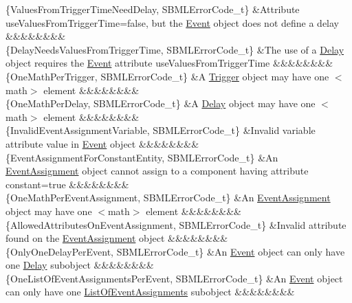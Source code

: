\begin{DoxyParagraph}{}
\begin{longtabu}
\{Values\+From\+Trigger\+Time\+Need\+Delay, S\+B\+M\+L\+Error\+Code\+\_\+t\} &Attribute \textquotesingle{}use\+Values\+From\+Trigger\+Time\textquotesingle{}=\textquotesingle{}false\textquotesingle{}, but the \hyperlink{class_event}{Event} object does not define a delay &&&&&&&&\\
\{Delay\+Needs\+Values\+From\+Trigger\+Time, S\+B\+M\+L\+Error\+Code\+\_\+t\} &The use of a \hyperlink{class_delay}{Delay} object requires the \hyperlink{class_event}{Event} attribute \textquotesingle{}use\+Values\+From\+Trigger\+Time\textquotesingle{} &&&&&&&&\\
\{One\+Math\+Per\+Trigger, S\+B\+M\+L\+Error\+Code\+\_\+t\} &A \hyperlink{class_trigger}{Trigger} object may have one {\ttfamily $<$math$>$} element &&&&&&&&\\
\{One\+Math\+Per\+Delay, S\+B\+M\+L\+Error\+Code\+\_\+t\} &A \hyperlink{class_delay}{Delay} object may have one {\ttfamily $<$math$>$} element &&&&&&&&\\
\{Invalid\+Event\+Assignment\+Variable, S\+B\+M\+L\+Error\+Code\+\_\+t\} &Invalid \textquotesingle{}variable\textquotesingle{} attribute value in \hyperlink{class_event}{Event} object &&&&&&&&\\
\{Event\+Assignment\+For\+Constant\+Entity, S\+B\+M\+L\+Error\+Code\+\_\+t\} &An \hyperlink{class_event_assignment}{Event\+Assignment} object cannot assign to a component having attribute \textquotesingle{}constant\textquotesingle{}=\textquotesingle{}true\textquotesingle{} &&&&&&&&\\
\{One\+Math\+Per\+Event\+Assignment, S\+B\+M\+L\+Error\+Code\+\_\+t\} &An \hyperlink{class_event_assignment}{Event\+Assignment} object may have one {\ttfamily $<$math$>$} element &&&&&&&&\\
\{Allowed\+Attributes\+On\+Event\+Assignment, S\+B\+M\+L\+Error\+Code\+\_\+t\} &Invalid attribute found on the \hyperlink{class_event_assignment}{Event\+Assignment} object &&&&&&&&\\
\{Only\+One\+Delay\+Per\+Event, S\+B\+M\+L\+Error\+Code\+\_\+t\} &An \hyperlink{class_event}{Event} object can only have one \hyperlink{class_delay}{Delay} subobject &&&&&&&&\\
\{One\+List\+Of\+Event\+Assignments\+Per\+Event, S\+B\+M\+L\+Error\+Code\+\_\+t\} &An \hyperlink{class_event}{Event} object can only have one \hyperlink{class_list_of_event_assignments}{List\+Of\+Event\+Assignments} subobject &&&&&&&&\\

\end{longtabu}
\end{DoxyParagraph}
